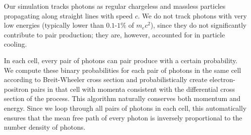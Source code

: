 Our simulation tracks photons as regular chargeless and massless particles propagating along straight lines with speed $c$. We do not track photons with very low energies (typically lower than $0.1\text{-}1\%$ of $m_e c^2$), since they do not significantly contribute to pair production; they are, however, accounted for in particle cooling.

In each cell, every pair of photons can pair produce with a certain probability. We compute these binary probabilities for each pair of photons in the same cell according to Breit-Wheeler cross section and probabilistically create electron-positron pairs in that cell with momenta consistent with the differential cross section of the process. This algorithm naturally conserves both momentum and energy. Since we loop through all pairs of photons in each cell, this automatically ensures that the mean free path of every photon is inversely proportional to the number density of photons.

